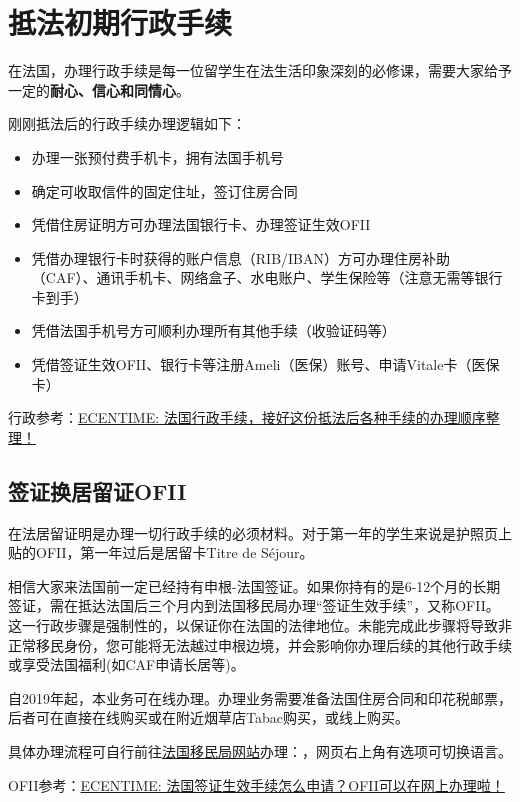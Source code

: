 \documentclass[UTF8]{ctexart}
\begin{document}
\newpage
\section{抵法初期行政手续}

在法国，办理行政手续是每一位留学生在法生活印象深刻的必修课，需要大家给予一定的\textbf{耐心、信心和同情心}。

刚刚抵法后的行政手续办理逻辑如下：
\begin{itemize}
    \item 办理一张预付费手机卡，拥有法国手机号
    \item 确定可收取信件的固定住址，签订住房合同
    \item 凭借住房证明方可办理法国银行卡、办理签证生效OFII
    \item 凭借办理银行卡时获得的账户信息（RIB/IBAN）方可办理住房补助（CAF）、通讯手机卡、网络盒子、水电账户、学生保险等（注意无需等银行卡到手）
    \item 凭借法国手机号方可顺利办理所有其他手续（收验证码等）
    \item 凭借签证生效OFII、银行卡等注册Ameli（医保）账号、申请Vitale卡（医保卡）
\end{itemize}

行政参考：\href{https://www.ecentime.com/article/demarches-etudiant-arrivant}{ECENTIME: 法国行政手续，接好这份抵法后各种手续的办理顺序整理！}
 
\subsection{签证换居留证OFII}
在法居留证明是办理一切行政手续的必须材料。对于第一年的学生来说是护照页上贴的OFII，第一年过后是居留卡Titre de Séjour。

相信大家来法国前一定已经持有申根-法国签证。如果你持有的是6-12个月的长期签证，需在抵达法国后三个月内到法国移民局办理“签证生效手续”，又称OFII。 这一行政步骤是强制性的，以保证你在法国的法律地位。未能完成此步骤将导致非正常移民身份，您可能将无法越过申根边境，并会影响你办理后续的其他行政手续或享受法国福利(如CAF申请长居等)。

自2019年起，本业务可在线办理。办理业务需要准备法国住房合同和印花税邮票，后者可在直接在线购买或在附近烟草店Tabac购买，或线上购买。

具体办理流程可自行前往\href{https://administration-etrangers-en-france.interieur.gouv.fr}{法国移民局网站}办理：，网页右上角有选项可切换语言。

OFII参考：\href{https://www.ecentime.com/article/tuto-ofii}{ECENTIME: 法国签证生效手续怎么申请？OFII可以在网上办理啦！}
 
\end{document}
